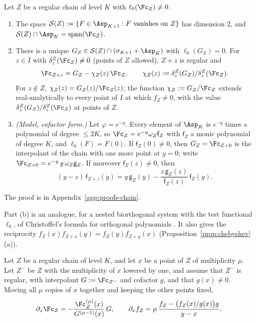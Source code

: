 \begin{lemma}\label{lem:christoffel}
Let $Z$ be a regular chain of level $K$ with $\ell_0(\Fc_Z)\ne0$.
\begin{enumerate}[label=(\alph*),leftmargin=2em]
\item The space $\mathcal S(Z):=\{F\in\Asp_{K+1}:F\text{ vanishes on }Z\}$ has dimension $2$, and
$\mathcal S(Z)\cap\Asp_K=\operatorname{span}(\Fc_Z)$.
\item There is a unique $G_Z\in\mathcal S(Z)\cap(\sigma_{K+1}+\Asp_K)$ with $\ell_0(G_Z)=0$. For $z\in I$ with
$\delta^Z_z(\Fc_Z)\ne0$ (points of $Z$ allowed), $Z+z$ is regular and
\[
\Fc_{Z+z}=G_Z-\chi_Z(z)\,\Fc_Z,\qquad \chi_Z(z):=\delta^Z_z(G_Z)/\delta^Z_z(\Fc_Z).
\]
For $z\notin Z$, $\chi_Z(z)=G_Z(z)/\Fc_Z(z)$; the function $\chi_Z:=G_Z/\Fc_Z$ extends real-analytically to every
point of $I$ at which $f_Z\ne0$, with the value $\delta^Z_z(G_Z)/\delta^Z_z(\Fc_Z)$ at points of $Z$.
\item \emph{(Model, cofactor form.)} Let $\varphi=e^{-y}$. Every element of $\Asp_K$ is $e^{-y}$ times a polynomial of
degree $\le2K$, so $\Fc_Z=e^{-y}\omega_Z\mathsf f_Z$ with $\mathsf f_Z$ a monic polynomial of degree $K$, and
$\ell_0(F)=F(0)$. If $\mathsf f_Z(0)\ne0$, then $G_Z=\Fc_{Z+0}$ is the interpolant of the chain with one more point
at $y=0$; write $\Fc_{Z+0}=e^{-y}\,y\,\omega_Z\mathsf g_Z$. If moreover $\mathsf f_Z(z)\ne0$, then
\[
(y-z)\,\mathsf f_{Z+z}(y)=y\,\mathsf g_Z(y)-\frac{z\,\mathsf g_Z(z)}{\mathsf f_Z(z)}\,\mathsf f_Z(y).
\]
\end{enumerate}
\end{lemma}

The proof is in Appendix~\ref{app:proofs-chain}.

Part (b) is an analogue, for a nested biorthogonal system with the test functional $\ell_0$, of Christoffel's formula for
orthogonal polynomials \cite[Theorem~2.5]{Sze75}.
It also gives the reciprocity $f_Z(x)f_{Z+x}(y)=f_Z(y)f_{Z+y}(x)$ (Proposition~\ref{prop:chebyshev}(a)).

\begin{lemma}\label{thm:ladder}
Let $Z$ be a regular chain of level $K$, and let $x$ be a point of $Z$ of multiplicity $\mu$. Let $Z^-$ be $Z$
with the multiplicity of $x$ lowered by one, and assume that $Z^-$ is regular, with interpolant $G:=\Fc_{Z^-}$
and cofactor $g$, and that $g(x)\ne0$. Moving all $\mu$ copies of $x$ together and keeping the other points
fixed,
\[
\partial_x\Fc_Z=-\frac{\Fc_Z^{(\mu)}(x)}{G^{(\mu-1)}(x)}\,G,\qquad
\partial_xf_Z=\mu\,\frac{f_Z-\bigl(f_Z(x)/g(x)\bigr)g}{y-x}.
\]
\end{lemma}

